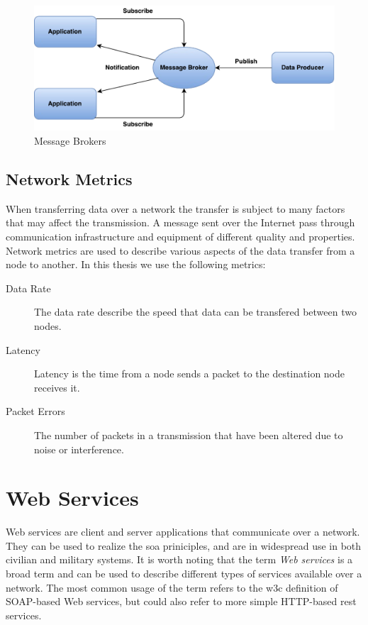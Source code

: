 \begin{figure}[h]
\centering
\includegraphics[scale=0.6]{images/pubsub.pdf}
\caption{Message Brokers}
\label{figure-message-brokers}
\end{figure}


\subsection{Network Metrics}

When transferring data over a network the transfer is subject to many factors
that may affect the transmission. A message sent over the Internet pass through
communication infrastructure and equipment of different quality and properties.
Network metrics are used to describe various aspects of the data transfer from a
node to another. In this thesis we use the following metrics:

\begin{description}

\item[Data Rate] The data rate describe the speed that data can be transfered
between two nodes.

\item[Latency] Latency is the time from a node sends a packet to the destination
node receives it.

\item[Packet Errors] The number of packets in a transmission that have been
altered due to noise or interference.

\end{description}


\section{Web Services}
\label{web-services}

Web services are client and server applications that communicate over a network.
They can be used to realize the \gls{soa} priniciples, and are in widespread use
in both civilian and military systems. It is worth noting that the term \textit{Web
services} is a broad term and can be used to describe different types of
services available over a network. The most common usage of the term refers to
the \gls{w3c} definition of SOAP-based Web services, but could also refer to
more simple HTTP-based \gls{rest} services.

